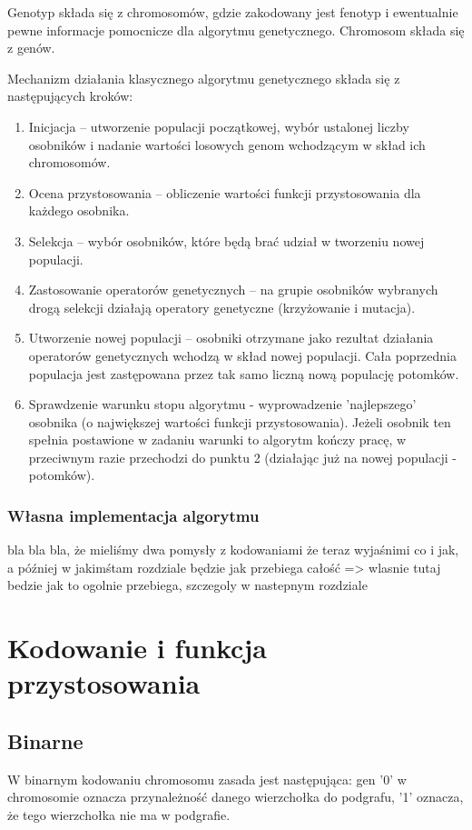 \documentclass[11pt]{aghdpl}
\begin{document}
Genotyp składa się z chromosomów, gdzie zakodowany jest fenotyp i ewentualnie pewne informacje
pomocnicze dla algorytmu genetycznego. Chromosom składa się z genów.

Mechanizm działania klasycznego algorytmu genetycznego składa się z następujących kroków:
\begin{enumerate}
\item Inicjacja – utworzenie populacji początkowej, wybór ustalonej liczby osobników i nadanie wartości losowych genom wchodzącym w skład ich chromosomów.
\item Ocena przystosowania – obliczenie wartości funkcji przystosowania dla każdego osobnika.
\item Selekcja – wybór osobników, które będą brać udział w tworzeniu nowej populacji.
\item Zastosowanie operatorów genetycznych – na grupie osobników wybranych drogą selekcji działają
operatory genetyczne (krzyżowanie i mutacja).
\item Utworzenie nowej populacji – osobniki otrzymane jako rezultat działania operatorów
genetycznych wchodzą w skład nowej populacji. Cała poprzednia populacja jest zastępowana przez
tak samo liczną nową populację potomków.
\item Sprawdzenie warunku stopu algorytmu - wyprowadzenie 'najlepszego' osobnika (o największej wartości funkcji przystosowania). Jeżeli osobnik ten spełnia postawione w zadaniu warunki to algorytm kończy pracę, w przeciwnym razie przechodzi do punktu 2 (działając już na nowej populacji - potomków).

\end{enumerate}
\subsection{Własna implementacja algorytmu}
\label{subsec:podejscie}
bla bla bla, że mieliśmy dwa pomysły z kodowaniami
że teraz wyjaśnimi co i jak, a później w jakimśtam rozdziale będzie jak przebiega całość => wlasnie tutaj bedzie jak to ogolnie przebiega, szczegoly w nastepnym rozdziale

\chapter{Kodowanie i funkcja przystosowania}
\label{cha:encoding}
\section{Binarne}
\label{sec:binary}
W binarnym kodowaniu chromosomu zasada jest następująca: gen '0' w chromosomie oznacza przynależność danego wierzchołka do podgrafu, '1' oznacza, że tego wierzchołka nie ma w podgrafie.
\end{document}
